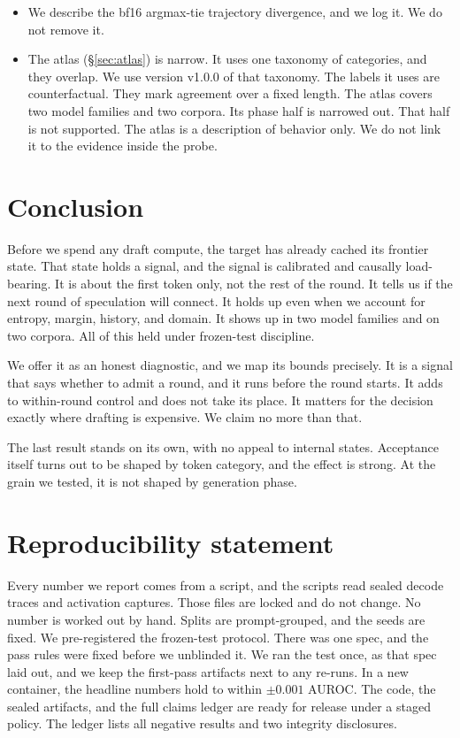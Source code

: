 \documentclass[11pt]{article}
\begin{document}
\begin{itemize}
\item We describe the bf16 argmax-tie trajectory divergence, and we log it. We
do not remove it.

\item The atlas (\S\ref{sec:atlas}) is narrow. It uses one taxonomy of
categories, and they overlap. We use version v1.0.0 of that taxonomy. The
labels it uses are counterfactual. They mark agreement over a fixed length.
The atlas covers two model families and two corpora. Its phase half is
narrowed out. That half is not supported. The atlas is a description of
behavior only. We do not link it to the evidence inside the probe.

\end{itemize}

\section{Conclusion}
Before we spend any draft compute, the target has already cached its frontier
state. That state holds a signal, and the signal is calibrated and causally
load-bearing. It is about the first token only, not the rest of the round. It
tells us if the next round of speculation will connect. It holds up even when
we account for entropy, margin, history, and domain. It shows up in two model
families and on two corpora. All of this held under frozen-test discipline.

We offer it as an honest diagnostic, and we map its bounds precisely. It is a
signal that says whether to admit a round, and it runs before the round starts.
It adds to within-round control and does not take its place. It matters for the
decision exactly where drafting is expensive. We claim no more than that.

The last result stands on its own, with no appeal to internal states.
Acceptance itself turns out to be shaped by token category, and the effect is
strong. At the grain we tested, it is not shaped by generation phase.

\section*{Reproducibility statement}
Every number we report comes from a script, and the scripts read sealed decode
traces and activation captures. Those files are locked and do not change. No
number is worked out by hand. Splits are prompt-grouped, and the seeds are
fixed. We pre-registered the frozen-test protocol. There was one spec, and the
pass rules were fixed before we unblinded it. We ran the test once, as that
spec laid out, and we keep the first-pass artifacts next to any re-runs. In a
new container, the headline numbers hold to within ${\pm}0.001$ AUROC. The
code, the sealed artifacts, and the full claims ledger are ready for release
under a staged policy. The ledger lists all negative results and two integrity
disclosures.
\end{document}
